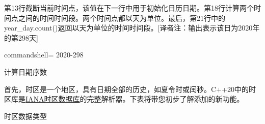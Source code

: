 第13行截断当前时间点，该值在下一行中用于初始化日历日期。第18行计算两个时间点之间的时间时间段。两个时间点都以天为单位。最后，第21行中的year\_day.count()返回以天为单位的时间时间段。[译者注：输出表示该日为2020年的第298天]

\begin{tcblisting}{commandshell={}}
2020-298
\end{tcblisting}

\begin{center}
计算日期序数
\end{center}


首先，时区是一个地区，具有日期全部的历史，如夏令时或闰秒。C++20中的时区库是\href{https://www.iana.org/timezones}{IANA时区数据库}的完整解析器。下表将带您初步了解添加的新功能。

\begin{center}
时区数据类型
\end{center}

